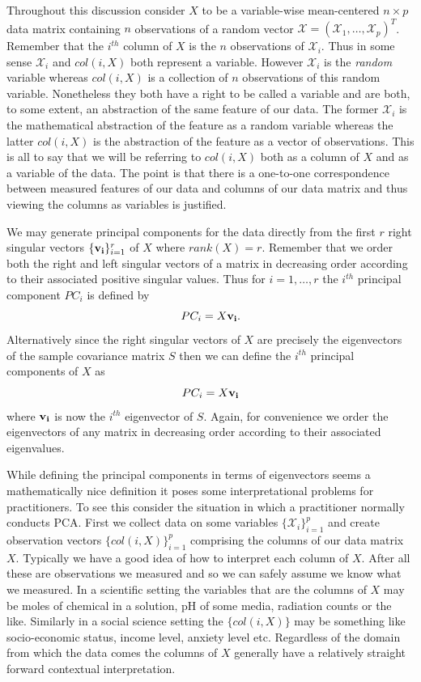 \documentclass{book}
\newcommand{\bs}[1]{\boldsymbol{#1}}
\newcommand{\rv}[1]{\bs{\mathscr{#1}}}
\begin{document}
Throughout this discussion consider $X$ to be a variable-wise mean-centered $n \times p$ data matrix containing $n$ observations of a random vector $\rv{X}=(\mathscr{X}_1,\ldots,\mathscr{X}_p)^T$. Remember that the $i^{th}$ column of $X$ is the $n$ observations of $\mathscr{X}_i$. Thus in some sense $\mathscr{X}_i$ and $col(i,X)$ both represent a variable. However $\mathscr{X}_i$ is the \emph{random} variable whereas $col(i,X)$ is a collection of $n$ observations of this random variable.  Nonetheless they both have a right to be called a variable and are both, to some extent, an abstraction of the same feature of our data. The former $\mathscr{X}_i$ is the mathematical abstraction of the feature as a random variable whereas the latter $col(i,X)$ is the abstraction of the feature as a vector of observations. This is all to say that we will be referring to $col(i,X)$ both as a column of $X$ and as a variable of the data. The point is that there is a one-to-one correspondence between measured features of our data and columns of our data matrix and thus viewing the columns as variables is justified. 

We may generate principal components for the data directly from the first $r$ right singular vectors $\{{\bf v_i}\}_{i=1}^{r}$ of $X$ where $rank(X)=r$. Remember that we order both the right and left singular vectors of a matrix in decreasing order according to their associated positive singular values. Thus for $i=1,\ldots,r$ the $i^{th}$ principal component $PC_i$ is defined by  
$$
PC_i=X{\bf v_i}.
$$
Alternatively since the right singular vectors of $X$ are precisely the eigenvectors of the sample covariance matrix $S$ then we can define the $i^{th}$ principal components of $X$ as 
$$
PC_i=X{\bf v_i}
$$
where ${\bf v_i}$ is now the $i^{th}$ eigenvector of $S$. Again, for convenience we order the eigenvectors of any matrix in decreasing order according to their associated eigenvalues. 

While defining the principal components in terms of eigenvectors seems a mathematically nice definition it poses some interpretational problems for practitioners. To see this consider the situation in which a practitioner normally conducts PCA. First we collect data on some variables $\{\mathscr{X}_i\}_{i=1}^{p}$ and create observation vectors $\{col(i,X)\}_{i=1}^{p}$ comprising the columns of our data matrix $X$. Typically we have a good idea of how to interpret each column of $X$. After all these are observations we measured and so we can safely assume we know what we measured. In a scientific setting the variables that are the columns of $X$ may be moles of chemical in a solution, pH of some media, radiation counts or the like. Similarly in a social science setting the $\{col(i,X)\}$ may be something like socio-economic status, income level, anxiety level etc. Regardless of the domain from which the data comes the columns of $X$ generally have a relatively straight forward contextual interpretation. 
\end{document}
